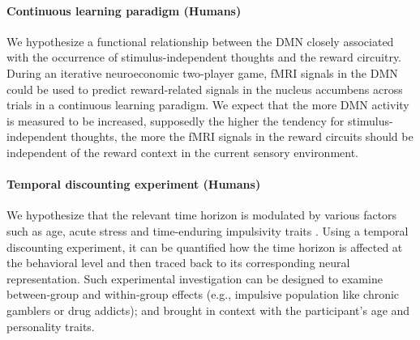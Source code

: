 \documentclass[10pt,letterpaper]{article}
\begin{document}
\paragraph*{Continuous learning paradigm (Humans)} We hypothesize a functional relationship between the DMN closely associated with the occurrence of stimulus-independent thoughts and the reward circuitry. During an iterative neuroeconomic two-player game, fMRI signals in the DMN could be used to predict reward-related signals in the nucleus accumbens across trials in a continuous learning paradigm. We expect that the more DMN activity is measured to be increased, supposedly the higher the tendency for stimulus-independent thoughts, the more the fMRI signals in the reward circuits should be independent of the reward context in the current sensory environment.

\paragraph*{Temporal discounting experiment (Humans)} We hypothesize that the relevant time horizon is modulated by various factors such as age, acute stress and time-enduring impulsivity traits
\citep{luksys2009stress, haushofer2014psychology}.
Using a temporal discounting experiment, it can be quantified how the time horizon is affected at the behavioral level and then traced back to its corresponding neural representation. Such experimental investigation can be designed to examine between-group and within-group effects (e.g., impulsive population like chronic gamblers or drug addicts); and brought in context with the participant’s age and personality traits.
\end{document}
